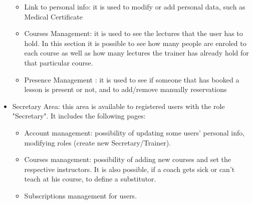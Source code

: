 \begin{itemize}
	\begin{itemize}
		\item Link to personal info: it is used to modify or add personal data, such as Medical Certificate
		\item Courses Management: it is used to see the lectures that the user has to hold. In this section it is possible to see how many people are enroled to each course as well as how many lectures the trainer has already hold for that particular course.
		\item Presence Management : it is used to see if someone that has booked a lesson is present or not, and to add/remove manually reservations
	\end{itemize}
	\item Secretary Area: this area is available to registered users with the role "Secretary".
	It includes the following pages:
	\begin{itemize}
		\item Account management: possibility of updating some users' personal info, modifying roles (create new Secretary/Trainer).
		\item Courses management: possibility of adding new courses and set the respective instructors. It is also possible, if a coach gets sick or can't teach at his course, to define a substitutor. 
		\item Subscriptions management for users.
	\end{itemize}
\end{itemize}

